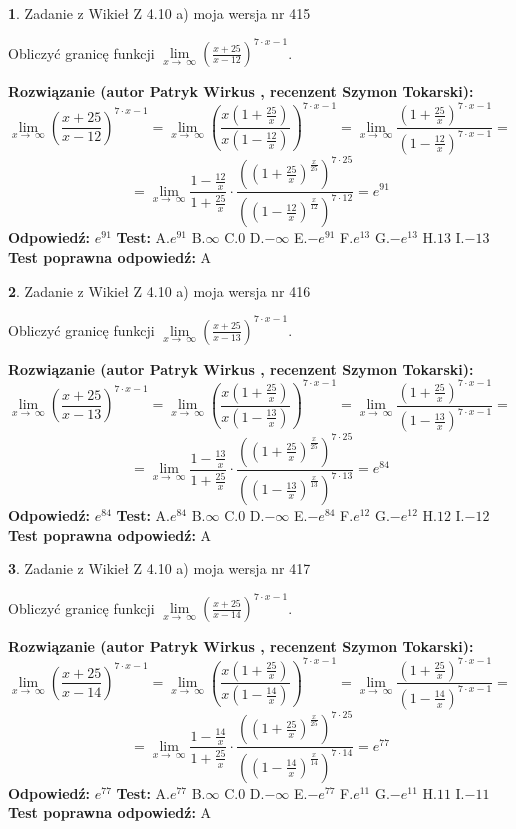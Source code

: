 \documentclass[12pt, a4paper]{article}
\theoremstyle{definition} %
\newtheorem{zad}{}
\newcommand{\zadStart}[1]{\begin{zad}#1\newline}
\newcommand{\zadStop}{\end{zad}}
\newcommand{\rozwStart}[2]{\noindent \textbf{Rozwiązanie (autor #1 , recenzent #2): }\newline}
\newcommand{\rozwStop}{\newline}
\newcommand{\odpStart}{\noindent \textbf{Odpowiedź:}\newline}
\newcommand{\odpStop}{\newline}
\newcommand{\testStart}{\noindent \textbf{Test:}\newline}
\newcommand{\testStop}{\newline}
\newcommand{\kluczStart}{\noindent \textbf{Test poprawna odpowiedź:}\newline}
\newcommand{\kluczStop}{\newline}
\begin{document}
\zadStart{Zadanie z Wikieł Z 4.10 a) moja wersja nr 415}

Obliczyć granicę funkcji  $\lim\limits_{x\to\ \infty}(\frac{x+25}{x-12})^{7\cdot x-1}$.
\zadStop
\rozwStart{Patryk Wirkus}{Szymon Tokarski}
$$\lim\limits_{x\to\ \infty}(\frac{x+25}{x-12})^{7\cdot x-1} = \lim\limits_{x\to\ \infty}(\frac{x(1+\frac{25}{x})}{x(1-\frac{12}{x})})^{7\cdot x-1}=\lim\limits_{x\to\ \infty}\frac{(1+\frac{25}{x})^{7\cdot x-1}}{(1-\frac{12}{x})^{7\cdot x-1}}=$$
$$=\lim\limits_{x\to\ \infty}\frac{1-\frac{12}{x}}{1+\frac{25}{x}}\cdot\frac{((1+\frac{25}{x})^{\frac{x}{25}})^{7\cdot25}}{((1-\frac{12}{x})^{\frac{x}{12}})^{7\cdot12}}=e^{91}$$
\rozwStop
\odpStart
$e^{91}$
\odpStop
\testStart
A.$e^{91}$ B.$\infty$ C.$0$ D.$-\infty$ E.$-e^{91}$
F.$e^{13}$ G.$-e^{13}$
H.$13$
I.$-13$
\testStop
\kluczStart
A
\kluczStop



\zadStart{Zadanie z Wikieł Z 4.10 a) moja wersja nr 416}

Obliczyć granicę funkcji  $\lim\limits_{x\to\ \infty}(\frac{x+25}{x-13})^{7\cdot x-1}$.
\zadStop
\rozwStart{Patryk Wirkus}{Szymon Tokarski}
$$\lim\limits_{x\to\ \infty}(\frac{x+25}{x-13})^{7\cdot x-1} = \lim\limits_{x\to\ \infty}(\frac{x(1+\frac{25}{x})}{x(1-\frac{13}{x})})^{7\cdot x-1}=\lim\limits_{x\to\ \infty}\frac{(1+\frac{25}{x})^{7\cdot x-1}}{(1-\frac{13}{x})^{7\cdot x-1}}=$$
$$=\lim\limits_{x\to\ \infty}\frac{1-\frac{13}{x}}{1+\frac{25}{x}}\cdot\frac{((1+\frac{25}{x})^{\frac{x}{25}})^{7\cdot25}}{((1-\frac{13}{x})^{\frac{x}{13}})^{7\cdot13}}=e^{84}$$
\rozwStop
\odpStart
$e^{84}$
\odpStop
\testStart
A.$e^{84}$ B.$\infty$ C.$0$ D.$-\infty$ E.$-e^{84}$
F.$e^{12}$ G.$-e^{12}$
H.$12$
I.$-12$
\testStop
\kluczStart
A
\kluczStop



\zadStart{Zadanie z Wikieł Z 4.10 a) moja wersja nr 417}

Obliczyć granicę funkcji  $\lim\limits_{x\to\ \infty}(\frac{x+25}{x-14})^{7\cdot x-1}$.
\zadStop
\rozwStart{Patryk Wirkus}{Szymon Tokarski}
$$\lim\limits_{x\to\ \infty}(\frac{x+25}{x-14})^{7\cdot x-1} = \lim\limits_{x\to\ \infty}(\frac{x(1+\frac{25}{x})}{x(1-\frac{14}{x})})^{7\cdot x-1}=\lim\limits_{x\to\ \infty}\frac{(1+\frac{25}{x})^{7\cdot x-1}}{(1-\frac{14}{x})^{7\cdot x-1}}=$$
$$=\lim\limits_{x\to\ \infty}\frac{1-\frac{14}{x}}{1+\frac{25}{x}}\cdot\frac{((1+\frac{25}{x})^{\frac{x}{25}})^{7\cdot25}}{((1-\frac{14}{x})^{\frac{x}{14}})^{7\cdot14}}=e^{77}$$
\rozwStop
\odpStart
$e^{77}$
\odpStop
\testStart
A.$e^{77}$ B.$\infty$ C.$0$ D.$-\infty$ E.$-e^{77}$
F.$e^{11}$ G.$-e^{11}$
H.$11$
I.$-11$
\testStop
\kluczStart
A
\kluczStop
\end{document}
